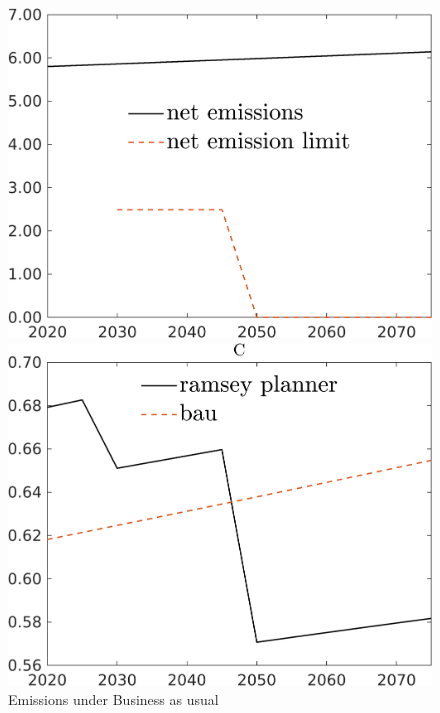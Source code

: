\begin{figure}[h!!]
	\centering
	\caption{Emissions under Business as usual }\label{fig:BAU}
	\begin{minipage}[]{0.32\textwidth}
		\includegraphics[width=1\textwidth]{../../codding_model/own_basedOnFried/optimalPol_elastS_DisuSci/figures/all_1705/Single_BAU_Emnet_spillover0_sep1_BN0_ineq0_red0_etaa0.79.png}
	\end{minipage}
	\begin{minipage}[]{0.32\textwidth}
		\includegraphics[width=1\textwidth]{../../codding_model/own_basedOnFried/optimalPol_elastS_DisuSci/figures/all_1705/C_BAUCompOPT_T_NoTaus_spillover0_sep1_BN0_ineq0_red0_etaa0.79_lgd1.png}

\end{minipage}
\end{figure}
